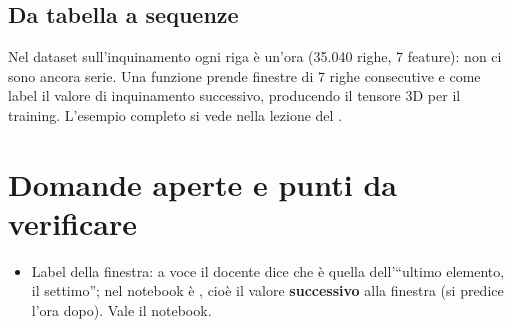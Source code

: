 \subsection{Da tabella a sequenze}
Nel dataset sull'inquinamento ogni riga è un'ora (35.040 righe, 7 feature): non ci sono ancora serie.
Una funzione  prende finestre di 7 righe consecutive e come label il valore
di inquinamento successivo, producendo il tensore 3D per il training. L'esempio completo si vede nella
lezione del .

\section{Domande aperte e punti da verificare}
\begin{verifica}
\begin{itemize}
  \item Label della finestra: a voce il docente dice che è quella dell'``ultimo elemento, il
    settimo''; nel notebook è , cioè il valore \textbf{successivo} alla
    finestra (si predice l'ora dopo). Vale il notebook.
\end{itemize}
\end{verifica}
